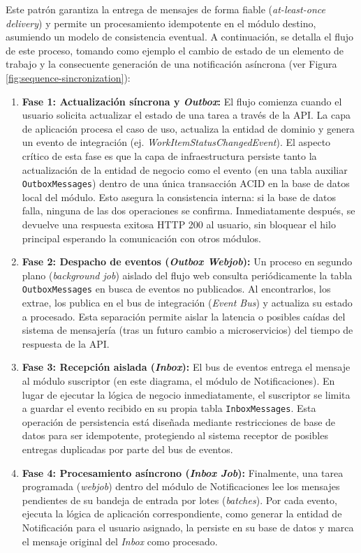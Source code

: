 Este patrón garantiza la entrega de mensajes de forma fiable (\emph{at-least-once delivery}) y permite un procesamiento idempotente en el módulo destino, asumiendo un modelo de consistencia eventual. A continuación, se detalla el flujo de este proceso, tomando como ejemplo el cambio de estado de un elemento de trabajo y la consecuente generación de una notificación asíncrona (ver Figura \ref{fig:sequence-sincronization}):

\begin{enumerate}
    \item \textbf{Fase 1: Actualización síncrona y \emph{Outbox}:} El flujo comienza cuando el usuario solicita actualizar el estado de una tarea a través de la API. La capa de aplicación procesa el caso de uso, actualiza la entidad de dominio y genera un evento de integración (ej. \emph{WorkItemStatusChangedEvent}). El aspecto crítico de esta fase es que la capa de infraestructura persiste tanto la actualización de la entidad de negocio como el evento (en una tabla auxiliar \texttt{OutboxMessages}) dentro de una única transacción ACID en la base de datos local del módulo. Esto asegura la consistencia interna: si la base de datos falla, ninguna de las dos operaciones se confirma. Inmediatamente después, se devuelve una respuesta exitosa HTTP 200 al usuario, sin bloquear el hilo principal esperando la comunicación con otros módulos.
    
    \item \textbf{Fase 2: Despacho de eventos (\emph{Outbox Webjob}):} Un proceso en segundo plano (\emph{background job}) aislado del flujo web consulta periódicamente la tabla \texttt{OutboxMessages} en busca de eventos no publicados. Al encontrarlos, los extrae, los publica en el bus de integración (\emph{Event Bus}) y actualiza su estado a procesado. Esta separación permite aislar la latencia o posibles caídas del sistema de mensajería (tras un futuro cambio a microservicios) del tiempo de respuesta de la API.
    
    \item \textbf{Fase 3: Recepción aislada (\emph{Inbox}):} El bus de eventos entrega el mensaje al módulo suscriptor (en este diagrama, el módulo de Notificaciones). En lugar de ejecutar la lógica de negocio inmediatamente, el suscriptor se limita a guardar el evento recibido en su propia tabla \texttt{InboxMessages}. Esta operación de persistencia está diseñada mediante restricciones de base de datos para ser idempotente, protegiendo al sistema receptor de posibles entregas duplicadas por parte del bus de eventos.
    
    \item \textbf{Fase 4: Procesamiento asíncrono (\emph{Inbox Job}):} Finalmente, una tarea programada (\emph{webjob}) dentro del módulo de Notificaciones lee los mensajes pendientes de su bandeja de entrada por lotes (\emph{batches}). Por cada evento, ejecuta la lógica de aplicación correspondiente, como generar la entidad de Notificación para el usuario asignado, la persiste en su base de datos y marca el mensaje original del \emph{Inbox} como procesado.
\end{enumerate}

